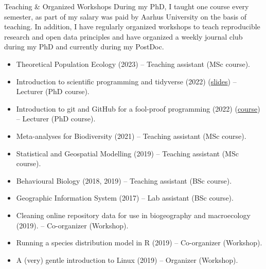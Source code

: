 \documentclass{resume} %
\newcommand{\spazio}{\begin{center} \par\noindent\rule{0.2\textwidth}{0.4pt} \end{center}}
\begin{document}
\begin{rSection}{Teaching \& Organized Workshops}
During my PhD, I taught one course every semester, as part of my salary was paid by Aarhus University on the basis of teaching.
In addition, I have regularly organized workshops to teach reproducible research and open data principles and have organized a weekly journal club during my PhD and currently during my PostDoc.

\begin{itemize}
\setlength\itemsep{-0.5em}
    \item Theoretical Population Ecology (2023) -- Teaching assistant (MSc course).
    \item Introduction to scientific programming and tidyverse (2022) (\href{https://emilio-berti.github.io/teaching/tidyverse.html#(1)}{slides}) -- Lecturer (PhD course).
    \item Introduction to git and GitHub for a fool-proof programming (2022) (\href{https://emilio-berti.github.io/idiv-git-introduction/}{course}) -- Lecturer (PhD course).
    \item Meta-analyses for Biodiversity (2021) -- Teaching assistant (MSc course).
    \item Statistical and Geospatial Modelling (2019) -- Teaching assistant (MSc course).
    \item Behavioural Biology (2018, 2019) -- Teaching assistant (BSc course).
    \item Geographic Information System (2017) -- Lab assistant (BSc course).
    \item Cleaning online repository data for use in biogeography and macroecology (2019). -- Co-organizer (Workshop).
    \item Running a species distribution model in R (2019) -- Co-organizer (Workshop).
    \item A (very) gentle introduction to Linux (2019) -- Organizer (Workshop).
\end{itemize}
\end{rSection}
\end{document}
